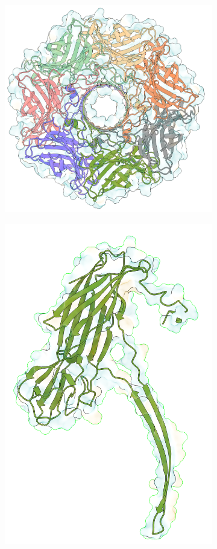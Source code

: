\begin{figure}[ht]
\begin{centering}
  \vspace{1.cm}

  \begin{subfigure}[t]{\dimexpr.3\linewidth-1.3em\relax}
  \centering
  \includegraphics[width=\linewidth,valign=t]{Figures/ahl-top-c.png}
  \end{subfigure}
  \begin{subfigure}[t]{\dimexpr.3\linewidth-1.3em\relax}
  \centering
  \includegraphics[width=.7\linewidth,valign=t]{Figures/ahl-mon-c.png}
  \end{subfigure}


\end{centering}
\end{figure}
